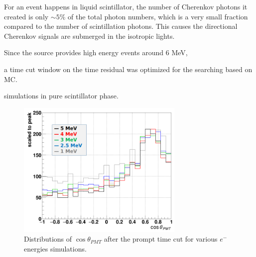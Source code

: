 For an event happens in liquid scintillator, the number of Cherenkov photons it created is only $\sim 5\%$ 
of the total photon numbers, which is a very small fraction compared to the number of scintillation photons. This causes the directional Cherenkov signals are submerged in the isotropic lights.

Since the  source provides high energy events around 6 MeV, 


a time cut window on the time residual was optimized for the searching based on MC.

simulations in pure scintillator phase.

\begin{figure}[!htb]
	\centering
	\includegraphics[width=8cm]{cherenkov_scint_variousE.png}
	\caption{Distributions of $\cos\theta_{PMT}$ after the prompt time cut for various $e^-$ energies simulations.}
	\label{cherenkov_variousE}
\end{figure}

